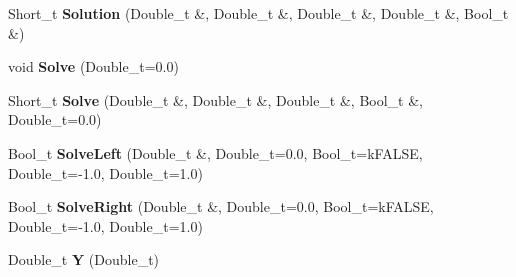 \begin{DoxyCompactItemize}
\item 
\hypertarget{classTPoly3_aa320c3c29151434c537c06fb79dd5713}{
Short\_\-t {\bfseries Solution} (Double\_\-t \&, Double\_\-t \&, Double\_\-t \&, Double\_\-t \&, Bool\_\-t \&)}
\label{classTPoly3_aa320c3c29151434c537c06fb79dd5713}

\item 
\hypertarget{classTPoly3_acaf258c863d48dcb936b145ed6062e3b}{
void {\bfseries Solve} (Double\_\-t=0.0)}
\label{classTPoly3_acaf258c863d48dcb936b145ed6062e3b}

\item 
\hypertarget{classTPoly3_a95f6a8297f08639f23e04de072ab81c1}{
Short\_\-t {\bfseries Solve} (Double\_\-t \&, Double\_\-t \&, Double\_\-t \&, Bool\_\-t \&, Double\_\-t=0.0)}
\label{classTPoly3_a95f6a8297f08639f23e04de072ab81c1}

\item 
\hypertarget{classTPoly3_ad696d45f90cef69580ab4e10da7c80d5}{
Bool\_\-t {\bfseries SolveLeft} (Double\_\-t \&, Double\_\-t=0.0, Bool\_\-t=kFALSE, Double\_\-t=-\/1.0, Double\_\-t=1.0)}
\label{classTPoly3_ad696d45f90cef69580ab4e10da7c80d5}

\item 
\hypertarget{classTPoly3_afc126bda29592c078cf8124671311cf1}{
Bool\_\-t {\bfseries SolveRight} (Double\_\-t \&, Double\_\-t=0.0, Bool\_\-t=kFALSE, Double\_\-t=-\/1.0, Double\_\-t=1.0)}
\label{classTPoly3_afc126bda29592c078cf8124671311cf1}

\item 
\hypertarget{classTPoly3_aff95d1e86fbafd348065a68cf7a6dc00}{
Double\_\-t {\bfseries Y} (Double\_\-t)}
\label{classTPoly3_aff95d1e86fbafd348065a68cf7a6dc00}

\end{DoxyCompactItemize}
